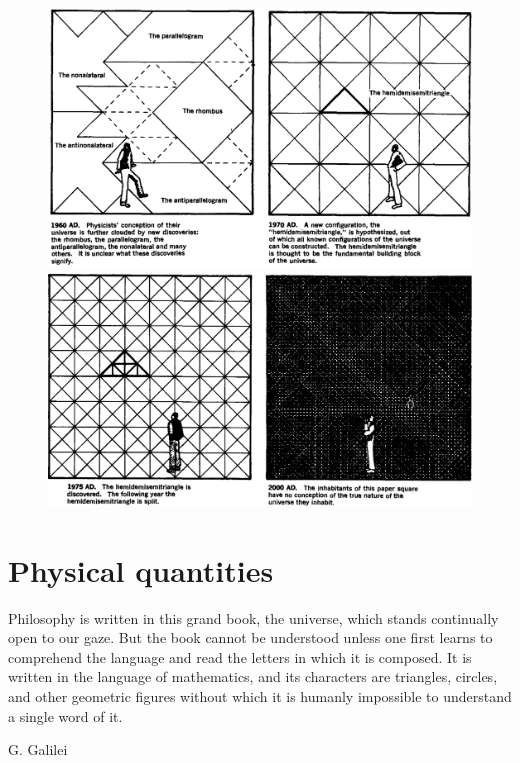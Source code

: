 \documentclass[a4paper,12pt,%
onecolumn,oneside,titlepage,%
british%
]{memoir}
\renewcommand*{\|}[1][]{\nonscript\:#1\vert\nonscript\:\mathopen{}}
\begin{document}
\begin{figure}[p]
  \centering
  \includegraphics[width=1.2\linewidth]{images/chew3.png}
\\[1em]  \includegraphics[width=1.2\linewidth]{images/chew4.png}
  \label{fig:chew2}
\end{figure}


\printpagenotes*
\clearpage
\chapter{Physical quantities}
\label{cha:physical_quantities}

\epigraph{Philosophy is written in this grand book, the universe, which stands continually open to our gaze. But the book cannot be understood unless one first learns to comprehend the language and read the letters in which it is composed. It is written in the language of mathematics, and its characters are triangles, circles, and other geometric figures without which it is humanly impossible to understand a single word of it.}{G. Galilei \cites*{galilei1623}}
\end{document}

